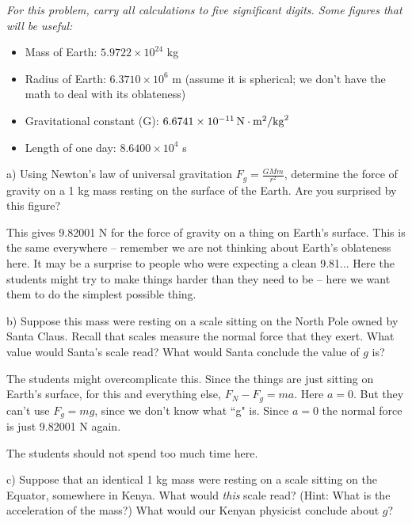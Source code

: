 \documentclass[12pt]{article}
\newcommand{\BI}{\begin{itemize}}
\newcommand{\EI}{\end{itemize}}
\begin{document}
\it For this problem, carry all calculations to five significant digits. Some figures that will be useful:

\rm
\BI
\item Mass of Earth: $5.9722\times 10^{24}$ kg
\item Radius of Earth: $ 6.3710 \times 10^6$ m (assume it is spherical; we don't have the math to deal with its oblateness)
\item Gravitational constant (G): $6.6741 \times 10^{-11} \,\rm N\cdot \rm m^2/{\rm kg}^2$
\item Length of one day: $8.6400 \times 10^4$ s
\EI


a) Using Newton's law of universal gravitation $F_g=\frac{GMm}{r^2}$, determine the force of gravity on a 1 kg mass resting on the surface of the Earth. Are you surprised by this figure?

{\color{Red} This gives 9.82001 N for the force of gravity on a thing on Earth's surface. This is the same everywhere -- remember we are not thinking about Earth's oblateness here. 
	It may be a surprise to people who were expecting a clean 9.81... Here the students might try to make things harder than they need to be -- here we want them to do the simplest possible thing.
}


b) Suppose this mass were resting on a scale sitting on the North Pole owned by Santa Claus. Recall that scales measure
the normal force that they exert. What value would Santa's scale read? What would Santa conclude the value of $g$ is?

{\color{Red} The students might overcomplicate this. Since the things are just sitting on Earth's surface, for this and everything else, $F_N - F_g = ma$. Here $a=0$. But they can't use $F_g = mg$, since we don't know what ``g" is. Since $a=0$ the normal force is just 9.82001 N again.

The students should not spend too much time here.
}



c) Suppose that an identical 1 kg mass were resting on a scale sitting on the Equator, somewhere in Kenya. What would {\it this} scale read? (Hint: What is the acceleration of the mass?) What would our Kenyan physicist conclude about $g$?
\end{document}
